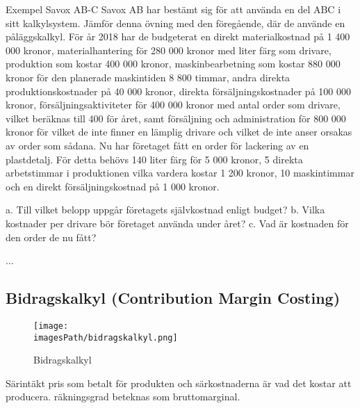 \begin{exampleblock}{Exempel Savox AB-C}
    Savox AB har bestämt sig för att använda en del ABC i sitt kalkylsystem. Jämför 
    denna övning med den föregående, där de använde en påläggskalkyl. För år 2018 har de 
    budgeterat en direkt materialkostnad på 1 400 000 kronor, materialhantering för 280 000 
    kronor med liter färg som drivare, produktion som kostar 400 000 kronor, maskinbearbetning 
    som kostar 880 000 kronor för den planerade maskintiden 8 800 timmar, andra direkta 
    produktionskostnader på 40 000 kronor, direkta försäljningskostnader på 100 000 kronor, 
    försäljningsaktiviteter för 400 000 kronor med antal order som drivare, vilket beräknas till 400 för 
    året, samt försäljning och administration för 800 000 kronor för vilket de inte finner en lämplig 
    drivare och vilket de inte anser orsakas av order som sådana. Nu har företaget fått en order för 
    lackering av en plastdetalj. För detta behövs 140 liter färg för 5 000 kronor, 5 direkta arbetstimmar i 
    produktionen vilka vardera kostar 1 200 kronor, 10 maskintimmar och en direkt försäljningskostnad 
    på 1 000 kronor.

    a. Till vilket belopp uppgår företagets självkostnad enligt budget?
    b. Vilka kostnader per drivare bör företaget använda under året? 
    c. Vad är kostnaden för den order de nu fått? 

   ... %
\end{exampleblock}
%


\newpage
\subsection{Bidragskalkyl (Contribution Margin Costing)}
\begin{figure}[!h]
    \centering
    \texttt{[image: \\imagesPath/bidragskalkyl.png]}
    \caption{Bidragskalkyl}
\end{figure}
Särintäkt pris som betalt för produkten och särkostnaderna är vad det kostar att producera.
räkningsgrad beteknas som bruttomarginal.

